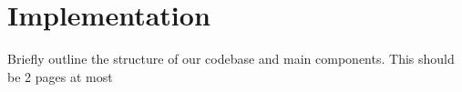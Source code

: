 \section{Implementation}
Briefly outline the structure of our codebase and main components. This should be 2 pages at most